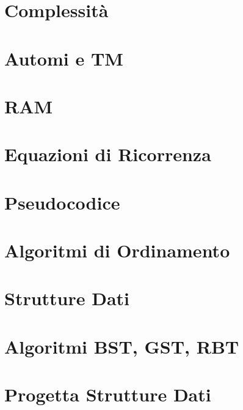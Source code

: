



\begin{titlepage}
    \maketitle
    \thispagestyle{empty}  %
\end{titlepage}

\section{Complessità}

\newpage

\section{Automi e TM}

\newpage

\section{RAM}

\newpage

\section{Equazioni di Ricorrenza}


\section{Pseudocodice}

\newpage

\section{Algoritmi di Ordinamento}

\newpage

\section{Strutture Dati}

\newpage

\section{Algoritmi BST, GST, RBT}

\newpage

\section{Progetta Strutture Dati}


